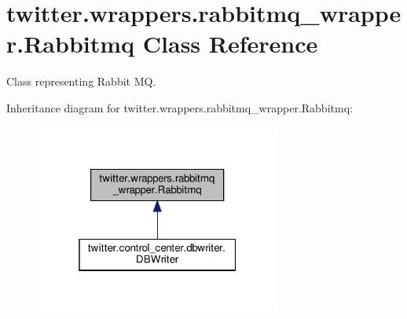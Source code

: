 \hypertarget{classtwitter_1_1wrappers_1_1rabbitmq__wrapper_1_1Rabbitmq}{}\section{twitter.\+wrappers.\+rabbitmq\+\_\+wrapper.\+Rabbitmq Class Reference}
\label{classtwitter_1_1wrappers_1_1rabbitmq__wrapper_1_1Rabbitmq}


Class representing Rabbit MQ.  




Inheritance diagram for twitter.\+wrappers.\+rabbitmq\+\_\+wrapper.\+Rabbitmq\+:
\nopagebreak
\begin{figure}[H]
\begin{center}
\leavevmode
\includegraphics[width=229pt]{da/d15/classtwitter_1_1wrappers_1_1rabbitmq__wrapper_1_1Rabbitmq__inherit__graph}
\end{center}
\end{figure}
